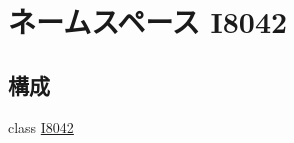 \hypertarget{namespaceI8042}{
\section{ネームスペース I8042}
\label{namespaceI8042}
}
\subsection*{構成}
\begin{DoxyCompactItemize}
\item 
class \hyperlink{classI8042_1_1I8042}{I8042}
\end{DoxyCompactItemize}
